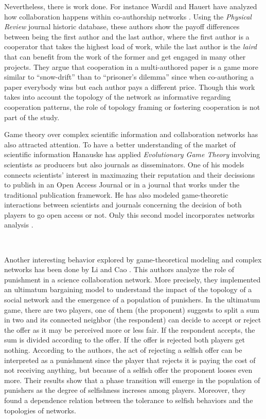 \documentclass{bmcart}
\begin{document}
{\color{red}Nevertheless, there is work done. For instance Wardil and Hauert have
analyzed how collaboration happens within co-authorship networks
\cite{Wardil-etal:2015}. Using the \emph{Physical Review} journal
historic database, these authors show the payoff differences between
being the first author and the last author, where the first author is
a cooperator that takes the highest load of work, while the last
author is the \emph{laird} that can benefit from the work of the
former and get engaged in many other projects. They argue that
cooperation in a multi-authored paper is a game more similar to ``snow-drift''
than to ``prisoner's dilemma'' since when co-authoring a
paper everybody wins but each author pays a different price. Though
this work takes into account the topology of the network as
informative regarding cooperation patterns, the role of topology
framing or fostering cooperation is not part of the study.} \\

{\color{red}

Game theory over complex scientific information and collaboration
networks has also attracted attention. To have a better understanding
of the market of scientific information Hanauske has applied
\emph{Evolutionary Game Theory} involving scientists as producers but
also journals as disseminators. One of his models connects scientists'
interest in maximazing their reputation and their decissions to
publish in an Open Access Journal or in a journal that works under the
traditional publication framework. He has also modeled game-theoretic
interactions between scientists and journals concerning the decision
of both players to go open access or not. Only this second model
incorporates networks analysis \cite{Hanauske-etal:2012}.}\\

{\color{red}

Another interesting behavior explored by game-theoretical modeling and
complex networks has been done by Li and Cao \cite{Li-etal:2009}. This
authors analyze the role of punishment in a science collaboration
network. More precisely, they implemented an ultimatum bargaining
model to understand the impact of the topology of a social network and
the emergence of a population of punishers. In the ultimatum game,
there are two players, one of them (the proponent) suggests to split a
sum in two and its connected neighbor (the respondent) can decide to
accept or reject the offer as it may be perceived more or less
fair. If the respondent accepts, the sum is divided according to the
offer. If the offer is rejected both players get nothing. According to
the authors, the act of rejecting a selfish offer can be interpreted
as a punishment since the player that rejects it is paying the cost of
not receiving anything, but because of a selfish offer the proponent
looses even more. Their results show that a phase transition will
emerge in the population of punishers as the degree of selfishness
increses among players. Moreover, they found a dependence relation
between the tolerance to selfish behaviors and the topologies of
networks.}\\
\end{document}
